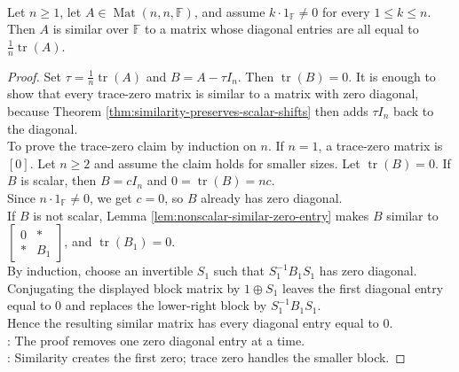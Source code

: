 \begin{theorem} \label{thm:similar-to-constant-diagonal} \\
Let $n\geq1$, let $A\in\operatorname{Mat}(n,n,\mathbb{F})$, and assume $k\cdot1_{\mathbb{F}}\neq0$ for every $1\leq k\leq n$. Then $A$ is similar over $\mathbb{F}$ to a matrix whose diagonal entries are all equal to $\frac{1}{n}\operatorname{tr}(A)$.
\begin{proof}
Set $\tau=\frac{1}{n}\operatorname{tr}(A)$ and $B=A-\tau I_n$. Then $\operatorname{tr}(B)=0$. It is enough to show that every trace-zero matrix is similar to a matrix with zero diagonal, because Theorem \ref{thm:similarity-preserves-scalar-shifts} then adds $\tau I_n$ back to the diagonal.\\
To prove the trace-zero claim by induction on $n$. If $n=1$, a trace-zero matrix is $[0]$. Let $n\geq2$ and assume the claim holds for smaller sizes. Let $\operatorname{tr}(B)=0$. If $B$ is scalar, then $B=cI_n$ and $0=\operatorname{tr}(B)=nc$.\\
Since $n\cdot1_{\mathbb{F}}\neq0$, we get $c=0$, so $B$ already has zero diagonal.\\
If $B$ is not scalar, Lemma \ref{lem:nonscalar-similar-zero-entry} makes $B$ similar to $\begin{bmatrix}
0 & *\\
* & B_1
\end{bmatrix}$, and $\operatorname{tr}(B_1)=0$.\\
By induction, choose an invertible $S_1$ such that $S_1^{-1}B_1S_1$ has zero diagonal. Conjugating the displayed block matrix by $1\oplus S_1$ leaves the first diagonal entry equal to $0$ and replaces the lower-right block by $S_1^{-1}B_1S_1$.\\
Hence the resulting similar matrix has every diagonal entry equal to $0$.\\
: The proof removes one zero diagonal entry at a time.\\
: Similarity creates the first zero; trace zero handles the smaller block.
\end{proof}
\end{theorem}

